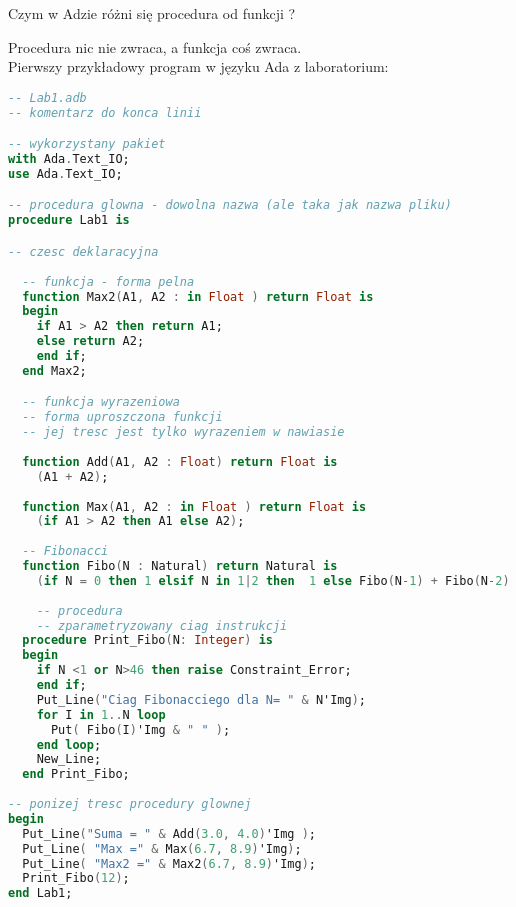 \documentclass[a4paper,15pt]{article}
\newcommand{\ask}[2]{
    \begin{tcolorbox}[colback=black!5!white,colframe=gray,title={Pytanie #1}]
        #2
    \end{tcolorbox}
}
\begin{document}
\ask{}{
Czym w Adzie różni się procedura od funkcji ?
}
Procedura nic nie zwraca, a funkcja coś zwraca. \\
Pierwszy przykładowy program w języku Ada z laboratorium:
\begin{lstlisting}[language=Ada, caption=Lab1.adb]
-- Lab1.adb
-- komentarz do konca linii

-- wykorzystany pakiet 
with Ada.Text_IO;
use Ada.Text_IO;

-- procedura glowna - dowolna nazwa (ale taka jak nazwa pliku)
procedure Lab1 is

-- czesc deklaracyjna  
  
  -- funkcja - forma pelna
  function Max2(A1, A2 : in Float ) return Float is
  begin
    if A1 > A2 then return A1;
    else return A2; 
    end if;
  end Max2;    

  -- funkcja wyrazeniowa 
  -- forma uproszczona funkcji
  -- jej tresc jest tylko wyrazeniem w nawiasie   
  
  function Add(A1, A2 : Float) return Float is
    (A1 + A2);
       
  function Max(A1, A2 : in Float ) return Float is
    (if A1 > A2 then A1 else A2);    
    
  -- Fibonacci      
  function Fibo(N : Natural) return Natural is   
    (if N = 0 then 1 elsif N in 1|2 then  1 else Fibo(N-1) + Fibo(N-2) );   
  
    -- procedura 
    -- zparametryzowany ciag instrukcji  
  procedure Print_Fibo(N: Integer) is
  begin
    if N <1 or N>46 then raise Constraint_Error;
    end if;
    Put_Line("Ciag Fibonacciego dla N= " & N'Img);
    for I in 1..N loop
      Put( Fibo(I)'Img & " " );
    end loop;   
    New_Line;
  end Print_Fibo;    
   
-- ponizej tresc procedury glownej   
begin
  Put_Line("Suma = " & Add(3.0, 4.0)'Img ); 
  Put_Line( "Max =" & Max(6.7, 8.9)'Img);
  Put_Line( "Max2 =" & Max2(6.7, 8.9)'Img);
  Print_Fibo(12);
end Lab1;  
\end{lstlisting}
\end{document}

